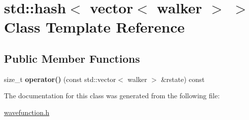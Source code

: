 \hypertarget{classstd_1_1hash_3_01vector_3_01walker_01_4_01_4}{\section{std\+:\+:hash$<$ vector$<$ walker $>$ $>$ Class Template Reference}
\label{classstd_1_1hash_3_01vector_3_01walker_01_4_01_4}
}
\subsection*{Public Member Functions}
\begin{DoxyCompactItemize}
\item 
\hypertarget{classstd_1_1hash_3_01vector_3_01walker_01_4_01_4_ab7e3d27a8925fd17e683f2849e96ff2c}{size\+\_\+t {\bfseries operator()} (const std\+::vector$<$ walker $>$ \&rstate) const }\label{classstd_1_1hash_3_01vector_3_01walker_01_4_01_4_ab7e3d27a8925fd17e683f2849e96ff2c}

\end{DoxyCompactItemize}


The documentation for this class was generated from the following file\+:\begin{DoxyCompactItemize}
\item 
\hyperlink{wavefunction_8h}{wavefunction.\+h}\end{DoxyCompactItemize}
